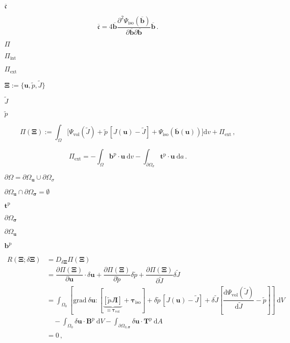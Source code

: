 \documentclass{article}
\begin{document}
$\overline{\mathfrak{c}}$
\pagebreak

\[ \overline{\mathfrak{c}} = 4 \overline{\mathbf{b}} \dfrac{ \partial^2 \Psi_{\textrm{iso}}(\overline{\mathbf{b}})} {\partial \overline{\mathbf{b}} \partial \overline{\mathbf{b}}} \overline{\mathbf{b}} \, . \]
\pagebreak

$\Pi$
\pagebreak

$\Pi_{\textrm{int}}$
\pagebreak

$\Pi_{\textrm{ext}}$
\pagebreak

$\mathbf{\Xi}:= \{ \mathbf{u}, \widetilde{p}, \widetilde{J} \}$
\pagebreak

$\widetilde{J}$
\pagebreak

$\widetilde{p}$
\pagebreak

\[ \Pi(\mathbf{\Xi}) := \int_\Omega \bigl[ \Psi_{\textrm{vol}}(\widetilde{J}) + \widetilde{p}\,[J(\mathbf{u}) - \widetilde{J}] + \Psi_{\textrm{iso}}(\overline{\mathbf{b}}(\mathbf{u})) \bigr] \textrm{d}v + \Pi_{\textrm{ext}} \, , \]
\pagebreak

\[ \Pi_{\textrm{ext}} = - \int_\Omega \mathbf{b}^\text{p} \cdot \mathbf{u}~\textrm{d}v - \int_{\partial \Omega_{\sigma}} \mathbf{t}^\text{p} \cdot \mathbf{u}~\textrm{d}a \, . \]
\pagebreak

$\partial \Omega = \partial \Omega_{\mathbf{u}} \cup \partial \Omega_{\sigma}$
\pagebreak

$\partial \Omega_{\mathbf{u}} \cap \partial \Omega_{\boldsymbol{\sigma}} = \emptyset$
\pagebreak

$\mathbf{t}^\text{p}$
\pagebreak

$ \partial \Omega_{\boldsymbol{\sigma}}$
\pagebreak

$\partial \Omega_{\mathbf{u}}$
\pagebreak

$\mathbf{b}^\text{p}$
\pagebreak

\begin{align*} R(\mathbf\Xi;\delta \mathbf{\Xi}) &= D_{\delta \mathbf{\Xi}}\Pi(\mathbf{\Xi}) \\ &= \dfrac{\partial \Pi(\mathbf{\Xi})}{\partial \mathbf{u}} \cdot \delta \mathbf{u} + \dfrac{\partial \Pi(\mathbf{\Xi})}{\partial \widetilde{p}} \delta \widetilde{p} + \dfrac{\partial \Pi(\mathbf{\Xi})}{\partial \widetilde{J}} \delta \tilde{J} \\ &= \int_{\Omega_0} \left[ \textrm{grad}\ \delta\mathbf{u} : [ \underbrace{[\widetilde{p} J \mathbf{I}]}_{\equiv \boldsymbol{\tau}_{\textrm{vol}}} + \boldsymbol{\tau}_{\textrm{iso}}] + \delta \widetilde{p}\, [ J(\mathbf{u}) - \widetilde{J}] + \delta \widetilde{J}\left[ \dfrac{\textrm{d} \Psi_{\textrm{vol}}(\widetilde{J})}{\textrm{d} \widetilde{J}} -\widetilde{p}\right] \right]~\textrm{d}V \\ &\quad - \int_{\Omega_0} \delta \mathbf{u} \cdot \mathbf{B}^\text{p}~\textrm{d}V - \int_{\partial \Omega_{0,\boldsymbol{\sigma}}} \delta \mathbf{u} \cdot \mathbf{T}^\text{p}~\textrm{d}A \\ &=0 \, , \end{align*}
\pagebreak
\end{document}

